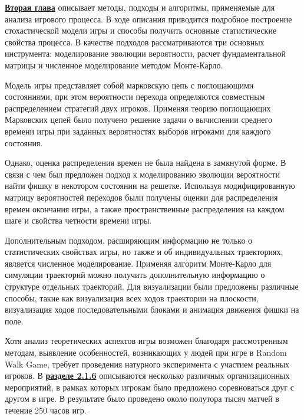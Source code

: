

\underline{\textbf{Вторая глава}} описывает методы, подходы и алгоритмы, применяемые для анализа игрового процесса.
В ходе описания приводится подробное построение стохастической модели игры и способы получить основные статистические свойства
процесса. В качестве подходов рассматриваются три основных инструмента: моделирование эволюции вероятности,
расчет фундаментальной матрицы и численное моделирование методом Монте-Карло. 

Модель игры представляет собой марковскую цепь с поглощающими состояниями, при этом вероятности перехода
определяются совместным распределением стратегий двух игроков.
Применяя теорию поглощающих Марковских цепей было получено решение задачи о вычислении среднего времени игры при заданных
вероятностях выборов игроками для каждого состояния. 

Однако, оценка распределения времен не была найдена в замкнутой форме.
В связи с чем был предложен подход к моделированию эволюции вероятности найти фишку в некотором состоянии на решетке.
Используя модифицированную матрицу вероятностей переходов были получены оценки для распределения времен окончания игры,
а также пространственные распределения на каждом шаге и свойства четности времени игры.

Дополнительным подходом, расширяющим информацию не только о статистических свойствах игры, но также и об 
индивидуальных траекториях, является численное моделирование. Применяя алгоритм Монте-Карло для симуляции 
траекторий можно получить дополнительную информацию о структуре отдельных траекторий. Для визуализации были
предложены различные способы, такие как визуализация всех ходов траектории на плоскости, визуализация ходов последовательными блоками
и анимация движения фишки на поле. 

Хотя анализ теоретических аспектов игры возможен благодаря рассмотренным методам,
выявление особенностей, возникающих у людей при игре в Random Walk Game, требует 
проведения натурного эксперимента с участием реальных игроков. В \underline{\textbf{разделе 2.1.6}}
описываются несколько различных организационных мероприятий, в рамках которых игрокам 
было предложено соревноваться друг с другом в игре. В результате было проведено около полутора тысяч
матчей в течение 250 часов игр.

